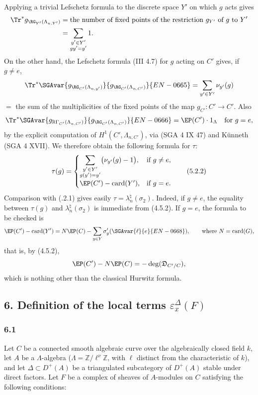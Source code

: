 Applying a trivial Lefschetz formula to the discrete space $Y'$ on which $g$ acts gives
\[
\begin{aligned}
\Tr^*g_{\RG_{Y'}(\Lambda_{n,Y'})}
&=\text{the number of fixed points of the restriction $g_{Y'}$ of $g$ to $Y'$}\\
&=\sum_{\substack{y'\in Y'\\gy'=y'}}1.
\end{aligned}
\]
On the other hand, the Lefschetz formula (III 4.7) for $g$ acting on $C'$ gives, if $g\ne e$,
\[
\Tr^*\SGAvar{g_{\RG_{C'}(\Lambda_{n,y'})}}{g_{\RG_{C'}(\Lambda_{n,C'})}}{EN-0665}
=
\sum_{y'\in Y'} \nu_{y'}(g)
\]
$=$ the sum of the multiplicities of the fixed points of the map $g_{C'}:C'\to C'$. Also
\[
\Tr^*\SGAvar{g_{\mathbb{R}\Gamma_{C'}(\Lambda_{n,C'})}}{g_{\RG_{C'}(\Lambda_{n,C'})}}{EN-0666}=\EP(C')\cdot1_\Lambda
\quad\text{for }g=e,
\]
by the explicit computation of $H^1(C',\Lambda_{n,C'})$, via (SGA 4 IX 47) and Künneth (SGA 4 XVII). We therefore obtain the following formula for $\tau$:
\[
\tau(g)=
\begin{cases}
\displaystyle\sum_{\substack{y'\in Y'\\g(y')=y'}}\bigl(\nu_{y'}(g)-1\bigr),& \text{if } g\ne e,\\[0.8em]
\EP(C')-\operatorname{card}(Y'),& \text{if } g=e.
\end{cases}
\tag{5.2.2}
\]
Comparison with (.2.1) gives easily $\tau=\lambda_n^\natural(\sigma_2)$. Indeed, if $g\ne e$, the equality between $\tau(g)$ and $\lambda_n^\natural(\sigma_2)$ is immediate from (4.5.2). If $g=e$, the formula to be checked is
\[
\EP(C')-\operatorname{card}(Y')
=
N\EP(C)-\sum_{y\in Y}\sigma'_y(\SGAvar{\ell}{e}{EN-0668}),
\qquad\text{where } N=\operatorname{card}(G),
\]
that is, by (4.5.2),
\[
\EP(C')-N\EP(C)=-\deg(\mathfrak D_{C'/C}),
\]
which is nothing other than the classical Hurwitz formula.

\subsection*{6. Definition of the local terms $\varepsilon_x^\Delta(F)$}

\subsubsection*{6.1}

Let $C$ be a connected smooth algebraic curve over the algebraically closed field $k$, let $A$ be a $\Lambda$-algebra ($\Lambda=\mathbb Z/\ell^\nu\mathbb Z$, with $\ell$ distinct from the characteristic of $k$), and let $\Delta\subset D^+(A)$ be a triangulated subcategory of $D^+(A)$ stable under direct factors. Let $F$ be a complex of sheaves of $A$-modules on $C$ satisfying the following conditions:

